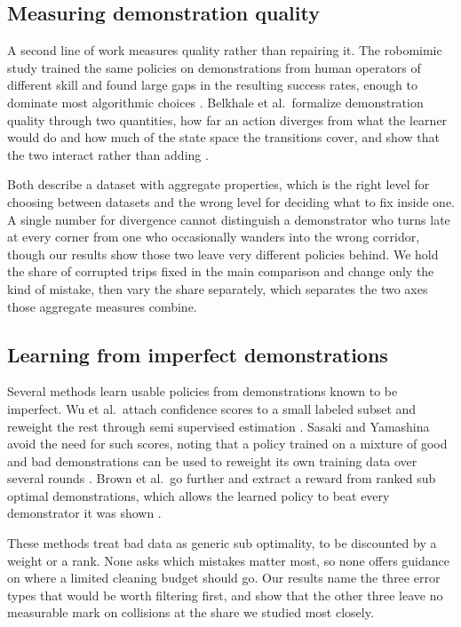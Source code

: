 \documentclass[conference]{IEEEtran}
\begin{document}
\subsection{Measuring demonstration quality}
A second line of work measures quality rather than repairing it. The robomimic study trained the same policies on
demonstrations from human operators of different skill and found large gaps in the resulting success rates,
enough to dominate most algorithmic choices \cite{robomimic}. Belkhale et al.\ formalize demonstration quality
through two quantities, how far an action diverges from what the learner would do and how much of the state space
the transitions cover, and show that the two interact rather than adding \cite{belkhale}.

Both describe a dataset with aggregate properties, which is the right level for choosing between datasets and the
wrong level for deciding what to fix inside one. A single number for divergence cannot distinguish a demonstrator
who turns late at every corner from one who occasionally wanders into the wrong corridor, though our results show
those two leave very different policies behind. We hold the share of corrupted trips fixed in the main comparison
and change only the kind of mistake, then vary the share separately, which separates the two axes those aggregate
measures combine.

\subsection{Learning from imperfect demonstrations}
Several methods learn usable policies from demonstrations known to be imperfect. Wu et al.\ attach confidence
scores to a small labeled subset and reweight the rest through semi supervised estimation \cite{wu2019}. Sasaki
and Yamashina avoid the need for such scores, noting that a policy trained on a mixture of good and bad
demonstrations can be used to reweight its own training data over several rounds \cite{sasaki}. Brown et al.\
go further and extract a reward from ranked sub optimal demonstrations, which allows the learned policy to beat
every demonstrator it was shown \cite{trex}.

These methods treat bad data as generic sub optimality, to be discounted by a weight or a rank. None asks which
mistakes matter most, so none offers guidance on where a limited cleaning budget should go. Our results name the
three error types that would be worth filtering first, and show that the other three leave no measurable mark on
collisions at the share we studied most closely.
\end{document}
